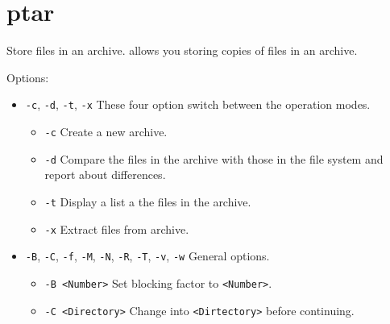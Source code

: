 \section{ptar}
\begin{man}
  \PP Store files in an archive.
   allows you storing copies of files in an archive.

             Options:

             \begin{itemize}
             \item {\tt -c}, {\tt -d}, {\tt -t}, {\tt -x}\newline
               These four option switch between the operation modes.

               \begin{itemize}
               \item {\tt -c}\newline
                 Create a new archive.

               \item {\tt -d}\newline
                 Compare the files in the archive with those in the file system
                 and report about differences.

               \item {\tt -t}\newline
                 Display a list a the files in the archive.

               \item {\tt -x}\newline
                 Extract files from archive.
               \end{itemize}

             \item {\tt -B}, {\tt -C}, {\tt -f}, {\tt -M}, {\tt -N}, {\tt -R}, {\tt -T}, {\tt -v}, {\tt -w}\newline
               General options.

               \begin{itemize}
               \item {\tt -B <Number>}\newline
                 Set blocking factor to {\tt <Number>}.

               \item {\tt -C <Directory>}\newline
                 Change into {\tt <Dirtectory>} before continuing.


\end{itemize}
\end{itemize}
\end{man}
